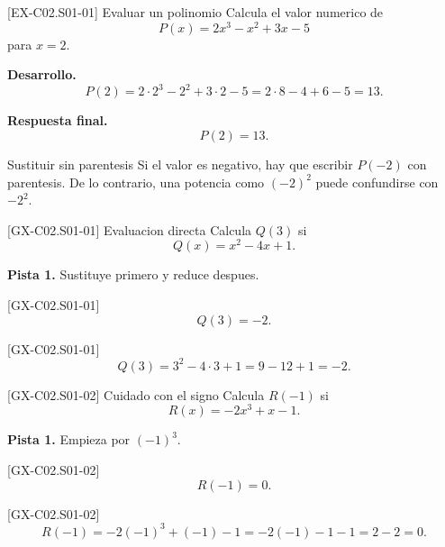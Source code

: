 \begin{solvedexample}{[EX-C02.S01-01] Evaluar un polinomio}
Calcula el valor numerico de
\[
P(x)=2x^3-x^2+3x-5
\]
para \(x=2\).

\textbf{Desarrollo.}
\[
P(2)=2\cdot 2^3-2^2+3\cdot 2-5=2\cdot 8-4+6-5=13.
\]

\textbf{Respuesta final.}
\[
P(2)=13.
\]
\end{solvedexample}

\begin{commonerror}{Sustituir sin parentesis}
Si el valor es negativo, hay que escribir \(P(-2)\) con parentesis. De lo contrario, una
potencia como \((-2)^2\) puede confundirse con \(-2^2\).
\end{commonerror}

\begin{guidedexercise}{[GX-C02.S01-01] Evaluacion directa}
Calcula \(Q(3)\) si
\[
Q(x)=x^2-4x+1.
\]

\textbf{Pista 1.} Sustituye primero y reduce despues.
\end{guidedexercise}

\begin{shortanswer}{[GX-C02.S01-01]}
\[
Q(3)=-2.
\]
\end{shortanswer}

\begin{fullsolution}{[GX-C02.S01-01]}
\[
Q(3)=3^2-4\cdot 3+1=9-12+1=-2.
\]
\end{fullsolution}

\begin{guidedexercise}{[GX-C02.S01-02] Cuidado con el signo}
Calcula \(R(-1)\) si
\[
R(x)=-2x^3+x-1.
\]

\textbf{Pista 1.} Empieza por \((-1)^3\).
\end{guidedexercise}

\begin{shortanswer}{[GX-C02.S01-02]}
\[
R(-1)=0.
\]
\end{shortanswer}

\begin{fullsolution}{[GX-C02.S01-02]}
\[
R(-1)=-2(-1)^3+(-1)-1=-2(-1)-1-1=2-2=0.
\]
\end{fullsolution}

